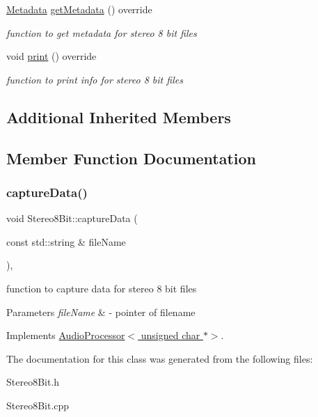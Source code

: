\begin{DoxyCompactItemize}
\mbox{\label{classStereo8Bit_ab1ae6fc0fcc05fa4392592a04164d2f8}} 
\hyperlink{structMetadata}{Metadata} \hyperlink{classStereo8Bit_ab1ae6fc0fcc05fa4392592a04164d2f8}{get\+Metadata} () override
\begin{DoxyCompactList}\small\item\em function to get metadata for stereo 8 bit files \end{DoxyCompactList}\item 
\mbox{\label{classStereo8Bit_aa927ff053fb7dbb373649e5baa3af655}} 
void \hyperlink{classStereo8Bit_aa927ff053fb7dbb373649e5baa3af655}{print} () override
\begin{DoxyCompactList}\small\item\em function to print info for stereo 8 bit files \end{DoxyCompactList}\end{DoxyCompactItemize}
\subsection*{Additional Inherited Members}


\subsection{Member Function Documentation}
\mbox{\label{classStereo8Bit_aabe25fe6e9bef1ddb8e1b2d4f38e5232}} 
\subsubsection{\texorpdfstring{capture\+Data()}{captureData()}}
{\footnotesize\ttfamily void Stereo8\+Bit\+::capture\+Data (\begin{DoxyParamCaption}\item[{const std\+::string \&}]{file\+Name }\end{DoxyParamCaption})\hspace{0.3cm}{\ttfamily [override]}, {\ttfamily [virtual]}}



function to capture data for stereo 8 bit files 


\begin{DoxyParams}{Parameters}
{\em file\+Name} & -\/ pointer of filename \\
\hline
\end{DoxyParams}


Implements \hyperlink{classAudioProcessor_a0d6d6ef552e671405150d2cfbd4095c5}{Audio\+Processor$<$ unsigned char $\ast$$>$}.



The documentation for this class was generated from the following files\+:\begin{DoxyCompactItemize}
\item 
Stereo8\+Bit.\+h\item 
Stereo8\+Bit.\+cpp\end{DoxyCompactItemize}
